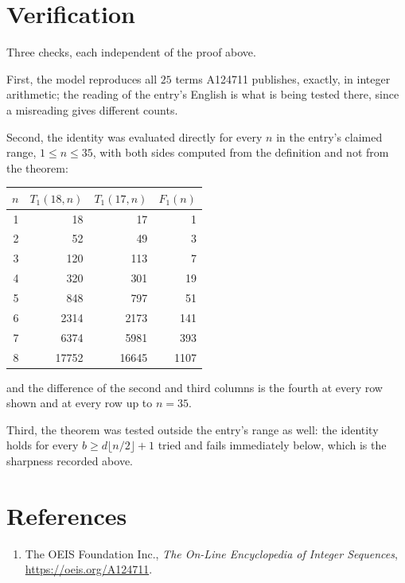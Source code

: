 \documentclass[11pt,a4paper]{article}
\theoremstyle{plain}
\theoremstyle{definition}
\begin{document}
\section{Verification}

Three checks, each independent of the proof above.

First, the model reproduces all $25$ terms A124711 publishes, exactly, in integer
arithmetic; the reading of the entry's English is what is being tested there, since a
misreading gives different counts.

Second, the identity was evaluated directly for every $n$ in the entry's claimed range,
$1\le n\le35$, with both sides computed from the definition and not from the theorem:

\begin{center}
\begin{tabular}{rrrr}
$n$ & $T_{1}(18,n)$ & $T_{1}(17,n)$ & $F_{1}(n)$ \\ \hline
1 & 18 & 17 & 1 \\
2 & 52 & 49 & 3 \\
3 & 120 & 113 & 7 \\
4 & 320 & 301 & 19 \\
5 & 848 & 797 & 51 \\
6 & 2314 & 2173 & 141 \\
7 & 6374 & 5981 & 393 \\
8 & 17752 & 16645 & 1107 \\
\end{tabular}
\end{center}

\noindent and the difference of the second and third columns is the fourth at every row shown
and at every row up to $n=35$.

Third, the theorem was tested outside the entry's range as well: the identity holds for every
$b\ge d\lfloor n/2\rfloor+1$ tried and fails immediately below, which is the sharpness recorded
above.

\section*{References}
\begin{enumerate}
\item The OEIS Foundation Inc., \emph{The On-Line Encyclopedia of Integer Sequences},
\url{https://oeis.org/A124711}.
\end{enumerate}
\end{document}
